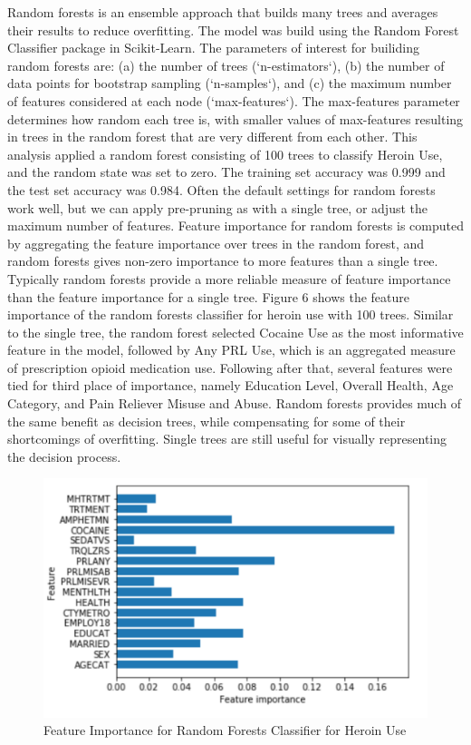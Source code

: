 \documentclass[sigconf]{acmart}
\begin{document}
Random forests is an ensemble approach that builds many trees and averages 
their results to reduce overfitting. The model was build using the Random 
Forest Classifier package in Scikit-Learn. The parameters of interest for
builiding random forests are: (a) the number of trees (`n-estimators`), 
(b) the number of data points for bootstrap sampling (`n-samples`), and 
(c) the maximum number of features considered at each node (`max-features`). 
The max-features parameter determines how random each tree is, with smaller 
values of max-features resulting in trees in the random forest that are very 
different from each other. This analysis applied a random forest consisting
of 100 trees to classify Heroin Use, and the random state was set to zero. 
The training set accuracy was 0.999 and the test set accuracy was 0.984. 
Often the default settings for random forests work well, but we can apply
pre-pruning as with a single tree, or adjust the maximum number of features. 
Feature importance for random forests is computed by aggregating the feature 
importance over trees in the random forest, and random forests gives
non-zero importance to more features than a single tree. Typically random
forests provide a more reliable measure of feature importance than the
feature importance for a single tree. Figure 6 shows the feature importance 
of the random forests classifier for heroin use with 100 trees. Similar to
the single tree, the random forest selected Cocaine Use as the most
informative feature in the model, followed by Any PRL Use, which is an 
aggregated measure of prescription opioid medication use. Following after 
that, several features were tied for third place of importance, namely 
Education Level, Overall Health, Age Category, and Pain Reliever Misuse 
and Abuse. Random forests provides much of the same benefit as decision
trees, while compensating for some of their shortcomings of overfitting.
Single trees are still useful for visually representing the decision process.

\begin{figure}[!ht]
  \centering\includegraphics[width=\columnwidth]{images/Figure6.pdf}
  \caption{Feature Importance for Random Forests Classifier for Heroin Use}
  \label{f:Figure6}
\end{figure}
\end{document}
